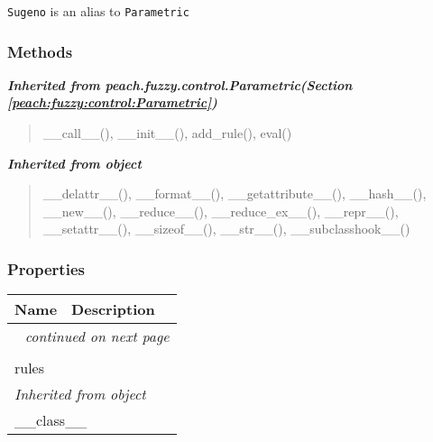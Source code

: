 \texttt{Sugeno} is an alias to \texttt{Parametric}


  \subsubsection{Methods}


\large{\textbf{\textit{Inherited from peach.fuzzy.control.Parametric\textit{(Section \ref{peach:fuzzy:control:Parametric})}}}}

\begin{quote}
\_\_call\_\_(), \_\_init\_\_(), add\_rule(), eval()
\end{quote}

\large{\textbf{\textit{Inherited from object}}}

\begin{quote}
\_\_delattr\_\_(), \_\_format\_\_(), \_\_getattribute\_\_(), \_\_hash\_\_(), \_\_new\_\_(), \_\_reduce\_\_(), \_\_reduce\_ex\_\_(), \_\_repr\_\_(), \_\_setattr\_\_(), \_\_sizeof\_\_(), \_\_str\_\_(), \_\_subclasshook\_\_()
\end{quote}


  \subsubsection{Properties}

    \vspace{-1cm}
\hspace{\varindent}\begin{longtable}{|p{\varnamewidth}|p{\vardescrwidth}|l}
\cline{1-2}
\cline{1-2} \centering \textbf{Name} & \centering \textbf{Description}& \\
\cline{1-2}
\endhead\cline{1-2}\multicolumn{3}{r}{\small\textit{continued on next page}}\\\endfoot\cline{1-2}
\endlastfoot\multicolumn{2}{|l|}{\textit{Inherited from peach.fuzzy.control.Parametric \textit{(Section \ref{peach:fuzzy:control:Parametric})}}}\\
\multicolumn{2}{|p{\varwidth}|}{\raggedright rules}\\
\cline{1-2}
\multicolumn{2}{|l|}{\textit{Inherited from object}}\\
\multicolumn{2}{|p{\varwidth}|}{\raggedright \_\_class\_\_}\\
\cline{1-2}
\end{longtable}

